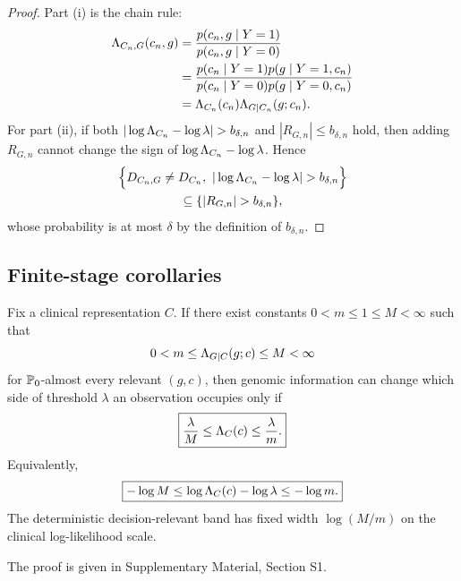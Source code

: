 \begin{proof}
Part (i) is the chain rule:
\begin{align}
\Lambda_{C_n,G}(c_n,g)
&=\frac{p(c_n,g\mid Y=1)}{p(c_n,g\mid Y=0)}\\
&=\frac{p(c_n\mid Y=1)p(g\mid Y=1,c_n)}{p(c_n\mid Y=0)p(g\mid Y=0,c_n)}\\
&=\Lambda_{C_n}(c_n)\Lambda_{G\mid C_n}(g;c_n).
\end{align}
For part (ii), if both $|\log \LR_{C_n}-\log\lambda|>b_{\delta,n}$ and $|R_{G,n}|\le b_{\delta,n}$ hold, then adding $R_{G,n}$ cannot change the sign of $\log \Lambda_{C_n}-\log\lambda$. Hence
\begin{multline}
\Bigl\{D_{C_n,G}\neq D_{C_n},\
|\log \LR_{C_n}-\log\lambda|>b_{\delta,n}\Bigr\}\\
\subseteq \{|R_{G,n}|>b_{\delta,n}\},
\end{multline}
whose probability is at most $\delta$ by the definition of $b_{\delta,n}$.
\end{proof}

\subsection{Finite-stage corollaries}

\begin{corollary}
\label{cor:deterministic-band}
Fix a clinical representation $C$. If there exist constants $0<m\le1\le M<\infty$ such that
\begin{equation}
0<m\le \Lambda_{G\mid C}(g;c)\le M<\infty
\label{eq:boundedconditional}
\end{equation}
for $\mathbb{P}_0$-almost every relevant $(g,c)$, then genomic information can change which side of threshold $\lambda$ an observation occupies only if
\begin{equation}
\boxed{\frac{\lambda}{M}\le \Lambda_C(c)\le \frac{\lambda}{m}.}
\label{eq:boundaryband}
\end{equation}
Equivalently,
\begin{equation}
\boxed{-\log M\le \log \Lambda_C(c)-\log\lambda\le -\log m.}
\label{eq:logboundaryband}
\end{equation}
The deterministic decision-relevant band has fixed width $\log(M/m)$ on the clinical log-likelihood scale.
\end{corollary}
The proof is given in Supplementary Material, Section S1.

